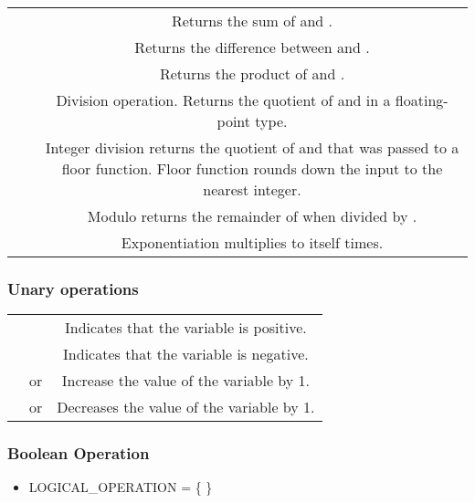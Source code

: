 \begin{center}
\begin{tabulary}{\linewidth}{|C|C|C|}
  \hline
   &  &  \\
  \hline
  \hline
  \cd{+} &  & Returns the sum of  and .\\
  \hline
  \cd{-} &  & Returns the difference between  and . \\
  \hline
  \cd{*} &  & Returns the product of  and . \\
  \hline
  \cd{/} &  & Division operation. Returns the quotient of  and  in a floating-point type. \\
  \hline
  \cd{//} &  & Integer division returns the quotient of  and  that was passed to a floor function. Floor function rounds down the input to the nearest integer. \\
  \hline
  \cd{\%} &  & Modulo returns the remainder of  when divided by . \\
  \hline
  \cd{\^{}} &  & Exponentiation multiplies  to itself  times. \\
  \hline
\end{tabulary}
\end{center}

\subsubsection{Unary operations}
\begin{center}
\begin{tabulary}{\linewidth}{|C|C|C|}
  \hline
   &  &  \\
  \hline
  \hline
  \cd{+} &  & Indicates that the variable is positive. \\
  \hline
  \cd{-} &  & Indicates that the variable is negative. \\
  \hline
  \cd{++} &  or  & Increase the value of the variable by 1. \\
  \hline
  \cd{--} &  or  & Decreases the value of the variable by 1.\\
  \hline
\end{tabulary}
\end{center}

\subsubsection{Boolean Operation}
\begin{itemize}
  \item LOGICAL\_OPERATION = \{ \cd{\&\&, ||, !} \}
\end{itemize}

